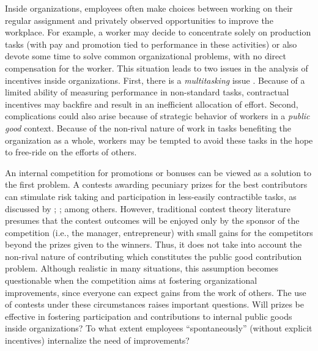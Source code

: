 \documentclass[11pt, titlepage]{article}
\begin{document}
Inside organizations, employees often make choices between working on
their regular assignment and privately observed opportunities to improve
the workplace. For example, a worker may decide to concentrate solely on
production tasks (with pay and promotion tied to performance in these
activities) or also devote some time to solve common organizational
problems, with no direct compensation for the worker. This situation
leads to two issues in the analysis of incentives inside organizations.
First, there is a \emph{multitasking} issue
\citep{holmstrom1991multitask, hellmann2011incentives, manso2011motivating}.
Because of a limited ability of measuring performance in non-standard
tasks, contractual incentives may backfire and result in an inefficient
allocation of effort. Second, complications could also arise because of
strategic behavior of workers in a \emph{public good} context. Because
of the non-rival nature of work in tasks benefiting the organization as
a whole, workers may be tempted to avoid these tasks in the hope to
free-ride on the efforts of others.

An internal competition for promotions or bonuses can be viewed as a
solution to the first problem. A contests awarding pecuniary prizes for
the best contributors can stimulate risk taking and participation in
less-easily contractible tasks, as discussed by \citet{lazear1981rank};
\citet{green1983comparison}; \citet{mary1984economic} among others.
However, traditional contest theory literature presumes that the contest
outcomes will be enjoyed only by the sponsor of the competition (i.e.,
the manager, entrepreneur) with small gains for the competitors beyond
the prizes given to the winners. Thus, it does not take into account the
non-rival nature of contributing which constitutes the public good
contribution problem. Although realistic in many situations, this
assumption becomes questionable when the competition aims at fostering
organizational improvements, since everyone can expect gains from the
work of others. The use of contests under these circumstances raises
important questions. Will prizes be effective in fostering participation
and contributions to internal public goods inside organizations? To what
extent employees ``spontaneously'' (without explicit incentives)
internalize the need of improvements?
\end{document}
